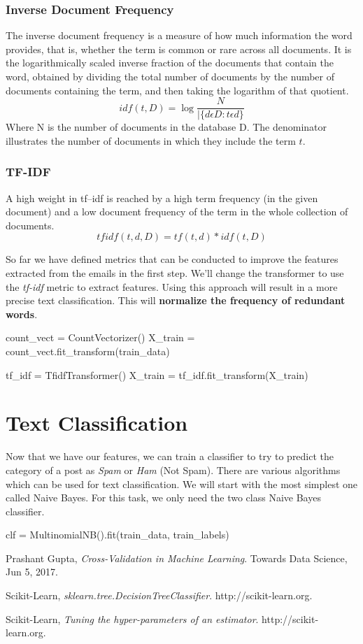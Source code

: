 \documentclass[12pt]{article}
\numberwithin{equation}{section}
\numberwithin{table}{section}
\numberwithin{figure}{section}
\begin{document}
\subsubsection{Inverse Document Frequency}
The inverse document frequency is a measure of how much information the word provides, that is, whether the term is common or rare across all documents. It is the logarithmically scaled inverse fraction of the documents that contain the word, obtained by dividing the total number of documents by the number of documents containing the term, and then taking the logarithm of that quotient.
$$
	idf(t, D) = \log \frac{N}{|\{d \epsilon D: t \epsilon d\}}
$$
Where N is the number of documents in the database D. The denominator illustrates the number of documents in which they include the term $t$.

\subsubsection{TF-IDF}
A high weight in tf–idf is reached by a high term frequency (in the given document) and a low document frequency of the term in the whole collection of documents.
$$
	tfidf(t, d, D) = tf(t, d) * idf(t, D)
$$

So far we have defined metrics that can be conducted to improve the features extracted from the emails in the first step. We'll change the transformer to use the \textit{tf-idf} metric to extract features. Using this approach will result in a more precise text classification. This will \textbf{normalize the frequency of redundant words}.
\begin{python}
	count_vect = CountVectorizer()
	X_train = count_vect.fit_transform(train_data)
	
	tf_idf = TfidfTransformer()
	X_train = tf_idf.fit_transform(X_train)
\end{python}

\section{Text Classification}
Now that we have our features, we can train a classifier to try to predict the category of a post as \textit{Spam} or \textit{Ham} (Not Spam). There are various algorithms which can be used for text classification. We will start with the most simplest one called Naive Bayes. For this task, we only need the two class Naive Bayes classifier.
\begin{python}
	clf = MultinomialNB().fit(train_data, train_labels)
	
\end{python}
\begin{thebibliography}{999}
	
	Prashant Gupta,
	\emph{Cross-Validation in Machine Learning}.
	Towards Data Science,
	Jun 5, 2017.
	
	Scikit-Learn,
	\emph{sklearn.tree.DecisionTreeClassifier}.
	http://scikit-learn.org.
	
	Scikit-Learn,
	\emph{Tuning the hyper-parameters of an estimator}.
	http://scikit-learn.org.
	
\end{thebibliography}
\end{document}
